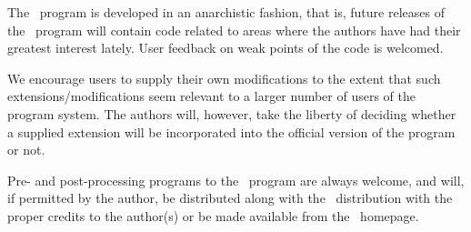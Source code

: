 The \dalton\ program is developed in an anarchistic fashion, that is,
future releases of the \dalton\ program will contain code related to
areas where the authors have had their greatest interest
lately. User feedback on weak points of the code is welcomed.

We encourage users to supply their own
modifications to the extent that
such extensions/modifications seem relevant to a larger number of
users of the program system. The authors will, however, take the
liberty of deciding whether a supplied extension will be incorporated
into the official version of the program or not.

Pre- and post-processing programs to the \dalton\ program are always
welcome, and will, if permitted by the author, be distributed along
with the \dalton\ distribution with the proper credits to the
author(s) or be made available from the \dalton\ homepage.
